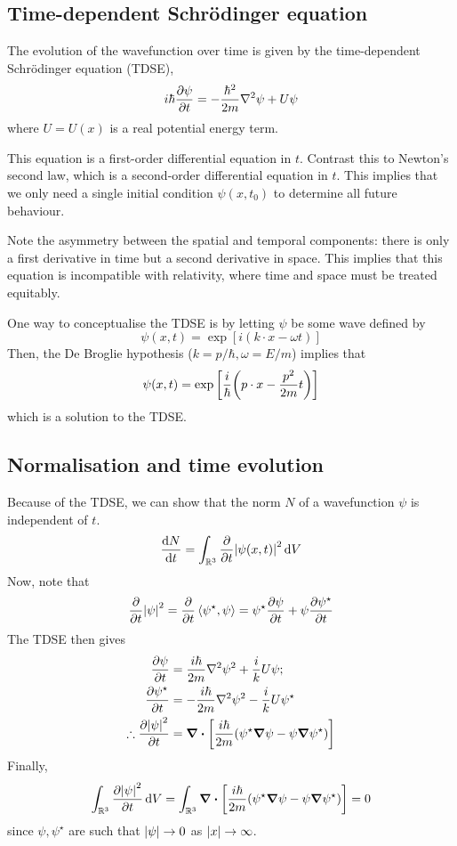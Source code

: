 \subsection{Time-dependent Schr\"odinger equation}
The evolution of the wavefunction over time is given by the time-dependent Schr\"odinger equation (TDSE),
\[
	i\hbar \pdv{\psi}{t} = -\frac{\hbar^2}{2m} \laplacian \psi + U \psi
\]
where \( U = U(x) \) is a real potential energy term.
\begin{remark}
	This equation is a first-order differential equation in \( t \).
	Contrast this to Newton's second law, which is a second-order differential equation in \( t \).
	This implies that we only need a single initial condition \( \psi(x,t_0) \) to determine all future behaviour.
\end{remark}
\begin{remark}
	Note the asymmetry between the spatial and temporal components: there is only a first derivative in time but a second derivative in space.
	This implies that this equation is incompatible with relativity, where time and space must be treated equitably.
\end{remark}
\noindent One way to conceptualise the TDSE is by letting \( \psi \) be some wave defined by
\[
	\psi(x,t) = \exp[ i(k \cdot x - \omega t) ]
\]
Then, the De Broglie hypothesis (\( k = p/\hbar, \omega = E/m \)) implies that
\[
	\psi(x,t) = \exp\qty[\frac{i}{\hbar}\qty(p \cdot x - \frac{p^2}{2m}t)]
\]
which is a solution to the TDSE.\@

\subsection{Normalisation and time evolution}
Because of the TDSE, we can show that the norm \( N \) of a wavefunction \( \psi \) is independent of \( t \).
\[
	\dv{N}{t} = \int_{\mathbb R^3} \pdv{t} \abs{\psi(x,t)}^2 \dd{V}
\]
Now, note that
\[
	\pdv{t} \abs{\psi}^2 = \pdv{t} \left\langle{\psi^\star, \psi}\right\rangle = \psi^\star \pdv{\psi}{t} + \psi \pdv{\psi^\star}{t}
\]
The TDSE then gives
\begin{align*}
	\pdv{\psi}{t}                    & = \frac{i \hbar}{2m} \laplacian \psi^2 + \frac{i}{k} U \psi;                   \\
	\pdv{\psi^\star}{t}              & = - \frac{i \hbar}{2m} \laplacian \psi^2 - \frac{i}{k} U \psi^\star            \\
	\therefore \pdv{\abs{\psi}^2}{t} & = \div[\frac{i\hbar}{2m}\qty(\psi^\star \grad{\psi} - \psi \grad{\psi^\star})]
\end{align*}
Finally,
\[
	\int_{\mathbb R^3} \pdv{\abs{\psi}^2}{t} \dd{V} = \int_{\mathbb R^3} \div[ \frac{i\hbar}{2m}\qty(\psi^\star \grad{\psi} - \psi \grad{\psi^\star}) ] = 0
\]
since \( \psi, \psi^\star \) are such that \( \abs{\psi} \to 0 \) as \( \abs{x} \to \infty \).
